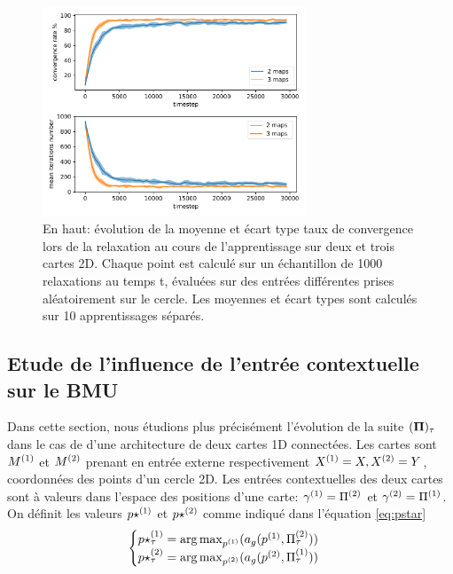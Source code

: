 \begin{figure}
\centering
\includegraphics[width=0.7\textwidth]{2D_conv_evolution_total.pdf}
\caption{En haut: évolution de la moyenne et écart type taux de convergence lors de la relaxation au cours de l'apprentissage sur deux et trois cartes 2D. Chaque point est calculé sur un échantillon de 1000 relaxations au temps t, évaluées sur des entrées différentes prises aléatoirement sur le cercle. Les moyennes et écart types sont calculés sur 10 apprentissages séparés.}
\label{fig:conv_evolution2D}
\end{figure}

\subsection{Etude de l'influence de l'entrée contextuelle sur le BMU}\label{sec:cont}

Dans cette section, nous étudions plus précisément l'évolution de la suite $(\mathbf{\Pi})_{\tau}$ dans le cas de d'une architecture de deux cartes 1D connectées. Les cartes sont $M^{({1})}$ et $M^{({2})}$ prenant en entrée externe respectivement $X^{({1})} = X, X^{({2})} = Y$, coordonnées des points d'un cercle 2D.
Les entrées contextuelles des deux cartes sont à valeurs dans l'espace des positions d'une carte: $\gamma^{({1})} = \Pi^{({2})}$ et $\gamma^{({2})} = \Pi^{({1})}$.
On définit les valeurs $p\star^{({1})}$ et $p\star^{({2})}$ comme indiqué dans l'équation \ref{eq:pstar}
\begin{equation} 
\begin{cases}
	p\star^{({1})}_{\tau} = \operatorname*{arg\,max}_{p^{({1})}}(a_g(p^{({1})},\Pi^{({2})}_{\tau})) \\
	p\star^{({2})}_{\tau} = \operatorname*{arg\,max}_{p^{({2})}}(a_g(p^{({2})},\Pi^{({1})}_{\tau})) \\
\end{cases}
\end{equation}

